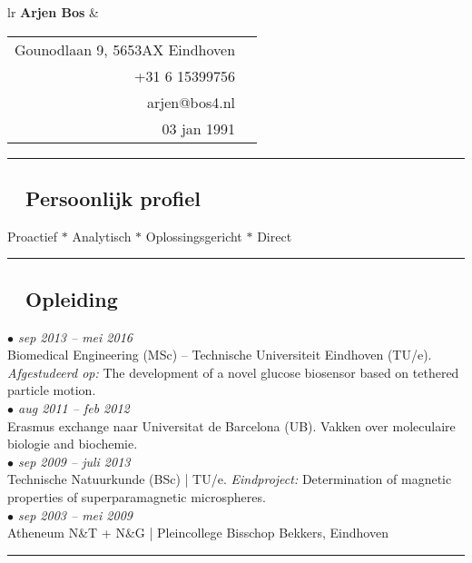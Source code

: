 \documentclass[a4paper,10pt]{article}
\newcommand{\cvsection}[2]{
	\subsection*{{\color{DarkBlue} \textnormal{\faicon{#2}}~ #1}}
}
\newcommand{\cvbullet}[1]{
	\emph{\color{DarkBlue} $\bullet$ #1}
}
\newcommand{\fablue}[1]{
	{\color{DarkBlue} \faicon{#1}}
}
\newcommand{\secsep}{
	\vspace{3mm}
	\hrule
}
\begin{document}
\begin{tabular}{lr}
	{\color{DarkBlue}\huge {\bf Arjen Bos}} \hspace{17em} &
	\begin{tabular}{rl}
		Gounodlaan 9, 5653AX Eindhoven & \fablue{map-marker}\\ 
		+31 6 15399756 & \fablue{phone}\\
		arjen@bos4.nl & \fablue{envelope}\\
		03 jan 1991 & \fablue{birthday-cake}
	\end{tabular}
\end{tabular}

\vspace{1mm}
\hrule

\begin{multicols}{2}

	\cvsection{Persoonlijk profiel}{user}
	{Proactief $\ast$ Analytisch $\ast$ Oplossingsgericht $\ast$ Direct \unskip\parfillskip 0pt \par}

	\secsep
	
	\cvsection{Opleiding}{sticky-note}
	\cvbullet{sep 2013 -- mei 2016}\\
		Biomedical Engineering (MSc) -- Technische Universiteit Eindhoven (TU/e).
		\emph{Afgestudeerd op:} The development of a novel glucose biosensor based on tethered particle motion.\\
	\cvbullet{aug 2011 -- feb 2012}\\
		Erasmus exchange naar Universitat de Barcelona (UB). Vakken over moleculaire biologie and biochemie.\\
	\cvbullet{sep 2009 -- juli 2013}\\
		Technische Natuurkunde (BSc) | TU/e.
		\emph{Eindproject:} Determination of magnetic properties of superparamagnetic microspheres.\\
	\cvbullet{sep 2003 -- mei 2009}\\
		Atheneum N\&T + N\&G | Pleincollege Bisschop Bekkers, Eindhoven

	\secsep


\end{multicols}
\end{document}
